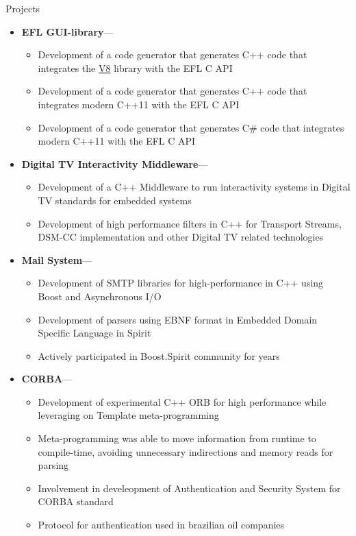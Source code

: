 \documentclass[10pt,oneside]{article}
\newenvironment{ressection}[1]{
	\vspace{4pt}
	{\fontfamily{phv}\selectfont\Large#1}
	\begin{itemize}
	\vspace{3pt}
}{
	\end{itemize}
}
\newcommand{\ressubitem}[1]{
	\vspace{-1pt}
	\item \begin{flushleft} #1 \end{flushleft}
}
\newcommand{\resonelinebigitem}[2]{
	\vspace{-5pt}
	\item
	\textbf{#1}---#2
}
\newenvironment{resonelinesubsec}[2]{
	\resonelinebigitem{#1}{#2}
	\vspace{-2pt}
	\begin{itemize}
}{
	\end{itemize}
}
\begin{document}
\begin{ressection}{Projects}
  \begin{resonelinesubsec}{EFL GUI-library}{}
    \ressubitem{Development of a code generator that generates C++
      code that integrates the
      \href{https://developers.google.com/v8/}{V8} library with the
      EFL C API}
    \ressubitem{Development of a code generator that generates C++
      code that integrates modern C++11 with the
      EFL C API}
    \ressubitem{Development of a code generator that generates C\#
      code that integrates modern C++11 with the
      EFL C API}
  \end{resonelinesubsec}


  \begin{resonelinesubsec}{Digital TV Interactivity Middleware}{}
    \ressubitem{Development of a C++ Middleware to run interactivity
      systems in Digital TV standards for embedded systems}
    \ressubitem{Development of high performance filters in C++ for
      Transport Streams, DSM-CC implementation and other Digital TV
      related technologies}
  \end{resonelinesubsec}

  \begin{resonelinesubsec}{Mail System}{}
    \ressubitem{Development of SMTP libraries for high-performance in
      C++ using Boost and Asynchronous I/O}
    \ressubitem{Development of parsers using EBNF format in Embedded
      Domain Specific Language in Spirit}
    \ressubitem{Actively participated in Boost.Spirit community for years}
  \end{resonelinesubsec}

  \begin{resonelinesubsec}{CORBA}{}
    \ressubitem{Development of experimental C++ ORB for high
      performance while leveraging on Template meta-programming}
    \ressubitem{Meta-programming was able to move information from runtime to compile-time, avoiding unnecessary
      indirections and memory reads for parsing}
    \ressubitem{Involvement in develeopment of Authentication and
      Security System for CORBA standard}
    \ressubitem{Protocol for authentication used in brazilian oil companies}
  \end{resonelinesubsec}

  
\end{ressection}
\end{document}
